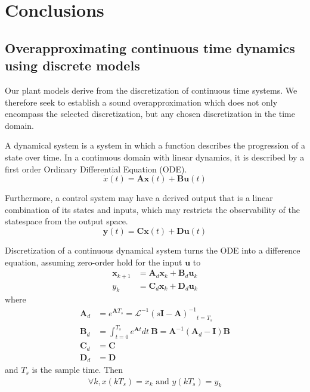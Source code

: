 \documentclass[sigconf]{llncs}
\newcommand{\mat}[1]{\boldsymbol{#1}}
\renewcommand{\vec}[1]{\boldsymbol{#1}}
\begin{document}
\section{Conclusions}
\label{sec:conclusions}

\newpage


\newpage
\appendix

\subsection{Overapproximating continuous time dynamics using discrete models}
\label{sec:cont_aa}
Our plant models derive from the discretization of
continuous time systems.  We therefore seek to establish a sound
overapproximation which does not only encompass the selected discretization,
but any chosen discretization in the time domain.

A dynamical system is a system in which a function describes the progression
of a state over time.  In a continuous domain with linear dynamics, it is
described by a first order Ordinary Differential Equation (ODE).
\begin{equation}
\dot{x}(t)=\mat{A}\vec{x}(t)+\mat{B}\vec{u}(t)%
\label{eq:dynamical}
\end{equation}

Furthermore, a control system may have a derived
output that is a linear combination of its states and inputs, which may
restricts the observability of the statespace from the output space.
\begin{equation}
\vec{y}(t)=\mat{C}\vec{x}(t)+\mat{D}\vec{u}(t)
\end{equation}

Discretization of a continuous dynamical system turns the ODE into a
difference equation, assuming zero-order hold for the input $\vec{u}$
to
\begin{align}
\label{eq:discretization}
\vec{x}_{k+1} &= \mat{A}_d\vec{x}_k+\mat{B}_d\vec{u}_k\\%
y_k &= \mat{C}_d \vec{x}_ k + \mat{D}_d \vec{u}_ k 
\end{align}
where
\begin{align}
\label{eq:discretize}
\mat{A}_d &= e^{\mat{A} T_s} = \mathcal{L}^{-1} { ( s \mat{I} - \mat{A} )^{-1} }_{t = T_s}\\
\mat{B}_d &= \int_{t = 0}^{T_s} e^{\mat{A} t} dt\ \mat{B} = \mat{A}^{-1} ( \mat{A}_d - \mat{I} ) \mat{B}\\
\mat{C}_d &= \mat{C}\\
\mat{D}_d &= \mat{D}
\end{align}
and $T_s$ is the sample time. Then
\begin{align*}
\forall k, x(kT_s)=x_k \text{ and } y(kT_s) = y_k
\end{align*}
\end{document}
